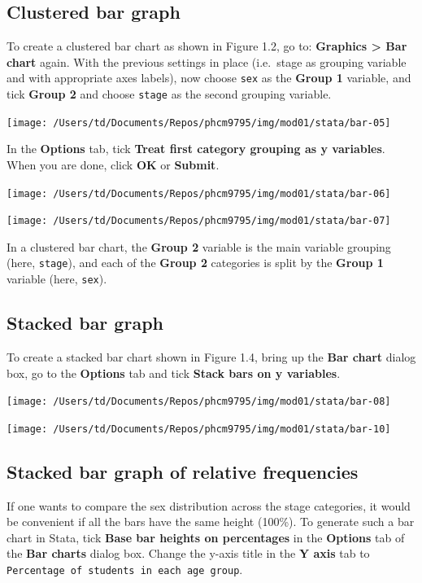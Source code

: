 \documentclass[
]{memoir}
\begin{document}
\hypertarget{clustered-bar-graph}{%
\subsection{Clustered bar graph}\label{clustered-bar-graph}}

To create a clustered bar chart as shown in Figure 1.2, go to: \textbf{Graphics \textgreater{} Bar chart} again. With the previous settings in place (i.e.~stage as grouping variable and with appropriate axes labels), now choose \texttt{sex} as the \textbf{Group 1} variable, and tick \textbf{Group 2} and choose \texttt{stage} as the second grouping variable.

\texttt{[image: /Users/td/Documents/Repos/phcm9795/img/mod01/stata/bar-05]}

In the \textbf{Options} tab, tick \textbf{Treat first category grouping as y variables}. When you are done, click \textbf{OK} or \textbf{Submit}.

\texttt{[image: /Users/td/Documents/Repos/phcm9795/img/mod01/stata/bar-06]}

\texttt{[image: /Users/td/Documents/Repos/phcm9795/img/mod01/stata/bar-07]}

In a clustered bar chart, the \textbf{Group 2} variable is the main variable grouping (here, \texttt{stage}), and each of the \textbf{Group 2} categories is split by the \textbf{Group 1} variable (here, \texttt{sex}).

\hypertarget{stacked-bar-graph}{%
\subsection{Stacked bar graph}\label{stacked-bar-graph}}

To create a stacked bar chart shown in Figure 1.4, bring up the \textbf{Bar chart} dialog box, go to the \textbf{Options} tab and tick \textbf{Stack bars on y variables}.

\texttt{[image: /Users/td/Documents/Repos/phcm9795/img/mod01/stata/bar-08]}

\texttt{[image: /Users/td/Documents/Repos/phcm9795/img/mod01/stata/bar-10]}

\hypertarget{stacked-bar-graph-of-relative-frequencies}{%
\subsection{Stacked bar graph of relative frequencies}\label{stacked-bar-graph-of-relative-frequencies}}

If one wants to compare the sex distribution across the stage categories, it would be convenient if all the bars have the same height (100\%). To generate such a bar chart in Stata, tick \textbf{Base bar heights on percentages} in the \textbf{Options} tab of the \textbf{Bar charts} dialog box. Change the y-axis title in the \textbf{Y axis} tab to \texttt{Percentage\ of\ students\ in\ each\ age\ group}.
\end{document}
